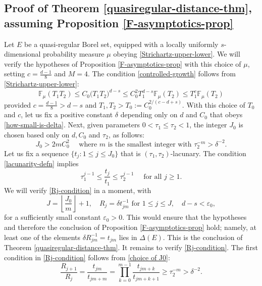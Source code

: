 \documentclass[a4paper,11pt]{amsart}
\numberwithin{equation}{section}
\begin{document}
\subsection{Proof of Theorem \ref{quasiregular-distance-thm}, assuming Proposition \ref{F-asymptotics-prop}} 
Let $E$ be a quasi-regular Borel set, equipped with a locally uniformly $s$-dimensional probability measure $\mu$ obeying \eqref{Strichartz-upper-lower}. We will verify the hypotheses of Proposition \ref{F-asymptotics-prop} with this choice of $\mu$, setting $c = \frac{d-1}{8}$ and $M = 4$.  The condition \eqref{controlled-growth} follows from \eqref{Strichartz-upper-lower}: 
\[ \mathbb F_{\mu}(T_1 T_2) \leq C_0 \bigl(T_1T_2 \bigr)^{d-s} \leq C_0^{2} T_1^{d-s} \mathbb F_{\mu}(T_2) \leq T_1^{c} \mathbb F_{\mu}(T_2)   \]
provided $c = \frac{d-1}{8}> d-s$ and $T_1, T_2 > T_0 := C_0^{2/(c-d+s)}$. With this choice of $T_0$ and $c$, let us fix a positive constant $\delta$ depending only on $d$ and $C_0$ that obeys \eqref{how-small-is-delta}. Next, given parameters $0 < \tau_1 \leq \tau_2 < 1$, the integer $J_0$ is chosen based only on $d, C_0$ and $\tau_2$, as follows:
\begin{equation} \label{choice of J0}
J_0 > 2m C_0^2 \quad \text{ where $m$ is the smallest integer with } \tau_2^{-m} > \delta^{-2}. 
\end{equation} 
\vskip0.1in 
\noindent Let us fix a sequence $\{t_j : 1 \leq j \leq J_0\}$ that is $(\tau_1, \tau_2)$-lacunary. The condition \eqref{lacunarity-defn} implies
\begin{equation} \label{lacunary-upper-lower}
\tau_1^{j-1} \leq \frac{t_j}{t_1} \leq \tau_2^{j-1} \quad \text{ for all } j \geq 1. 
\end{equation} 
We will verify \eqref{Rj-condition} in a moment, with 
\begin{equation} J = \left\lfloor \frac{J_0}{m} \right\rfloor + 1, \quad R_ j = \delta t_{jm}^{-1} \text{ for } 1 \leq j \leq J, \quad d-s < \varepsilon_0,  \label{J} \end{equation}  for a sufficiently small constant $\varepsilon_0 > 0$. This would ensure that the hypotheses and therefore the conclusion of Proposition \ref{F-asymptotics-prop} hold; namely, at least one of the elements $\delta R_{jm}^{-1} = t_{jm}$ lies in $\Delta(E)$. This is the conclusion of Theorem \ref{quasiregular-distance-thm}. 
\vskip0.1in
\noindent It remains to verify \eqref{Rj-condition}. The first condition in \eqref{Rj-condition} follows from \eqref{choice of J0}:
\[ \frac{R_{j+1}}{R_j} = \frac{t_{jm}}{t_{jm+m}} = \prod_{k=0}^{m-1} \frac{t_{jm+k}}{t_{jm+k+1}} \geq \tau_2^{-m} > \delta^{-2}. \]  
\end{document}
